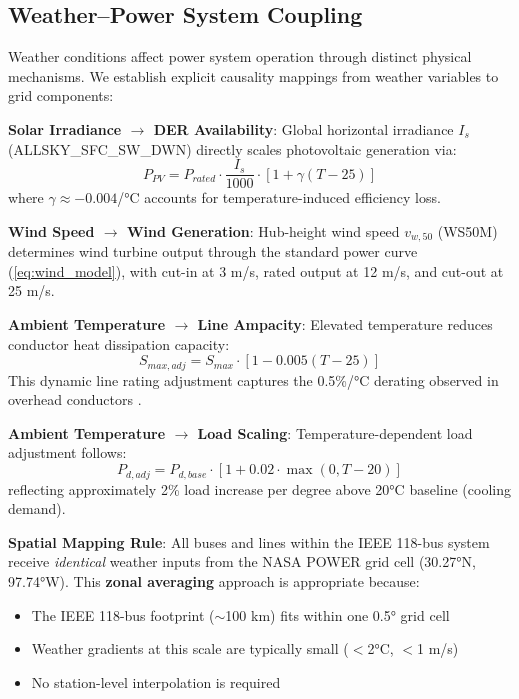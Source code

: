 \documentclass[journal,12pt,onecolumn]{IEEEtran}
\begin{document}
\subsection{Weather--Power System Coupling}
\label{subsec:coupling}

Weather conditions affect power system operation through distinct physical mechanisms. We establish explicit causality mappings from weather variables to grid components:

\textbf{Solar Irradiance $\rightarrow$ DER Availability}: Global horizontal irradiance $I_s$ (ALLSKY\_SFC\_SW\_DWN) directly scales photovoltaic generation via:
\begin{equation}
P_{PV} = P_{rated} \cdot \frac{I_s}{1000} \cdot [1 + \gamma(T - 25)]
\end{equation}
where $\gamma \approx -0.004$/°C accounts for temperature-induced efficiency loss.

\textbf{Wind Speed $\rightarrow$ Wind Generation}: Hub-height wind speed $v_{w,50}$ (WS50M) determines wind turbine output through the standard power curve (\ref{eq:wind_model}), with cut-in at 3 m/s, rated output at 12 m/s, and cut-out at 25 m/s.

\textbf{Ambient Temperature $\rightarrow$ Line Ampacity}: Elevated temperature reduces conductor heat dissipation capacity:
\begin{equation}
S_{max,adj} = S_{max} \cdot [1 - 0.005(T - 25)]
\end{equation}
This dynamic line rating adjustment captures the 0.5\%/°C derating observed in overhead conductors \cite{ref22}.

\textbf{Ambient Temperature $\rightarrow$ Load Scaling}: Temperature-dependent load adjustment follows:
\begin{equation}
P_{d,adj} = P_{d,base} \cdot [1 + 0.02 \cdot \max(0, T - 20)]
\end{equation}
reflecting approximately 2\% load increase per degree above 20°C baseline (cooling demand).

\textbf{Spatial Mapping Rule}: All buses and lines within the IEEE 118-bus system receive \textit{identical} weather inputs from the NASA POWER grid cell (30.27°N, 97.74°W). This \textbf{zonal averaging} approach is appropriate because:
\begin{itemize}
    \item The IEEE 118-bus footprint ($\sim$100 km) fits within one 0.5° grid cell
    \item Weather gradients at this scale are typically small ($<$2°C, $<$1 m/s)
    \item No station-level interpolation is required
\end{itemize}
\end{document}
